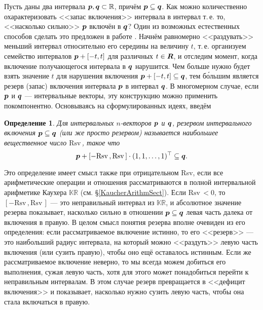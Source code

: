 \documentclass[a5paper,openany]{book}
\newcommand{\mbf}[1]{\protect\text{\boldmath$#1$}}
\newcommand{\mbb}{\mathbb}
\newcommand{\Rsv}{\mathrm{Rsv}\,}
\newtheorem{definition}{Определение}[section]
\begin{document}
Пусть даны два интервала $\mbf{p}, \mbf{q}\subset\mbb{R}$, причём $\mbf{p}\subseteq\mbf{q}$. 
Как можно количественно охарактеризовать <<запас включения>> интервала в интервал т.\,е. то, 
<<насколько сильно>>  $\mbf{p}$ включён в $\mbf{q}$? Один из возможных естественных способов 
сделать это предложен в работе \cite{SharysReserve}. Начнём равномерно <<раздувать>> меньший  
интервал относительно его середины на величину $t$, т.\,е. организуем семейство интервалов 
$\mbf{p} + [-t, t]$ для различных $t\in\mbf{R}$, и отследим момент, когда включение 
получающегося интервала в $\mbf{q}$ нарушится. Чем больше нужно будет взять значение $t$ 
для нарушения включения $\mbf{p} + [-t, t]\subseteq\mbf{q}$, тем б\'{о}льшим является 
резерв (запас) включения интервала $\mbf{p}$ в интервал $\mbf{q}$. В многомерном случае, 
если $\mbf{p}$ и $\mbf{q}$ --- интервальные векторы, эту конструкцию можно применить 
покомпонентно. Основываясь на сформулированных идеях, введём 
  
\begin{definition}   
Для интервальных $n$-векторов $\mbf{p}$ и $\mbf{q}$, \textsl{резервом интервального включения} 
$\mbf{p}\subseteq\mbf{q}$ (или же просто \textsl{резервом}) называется наибольшее вещественное 
число $\Rsv$, такое что             
\begin{equation*} 
\mbf{p} + [-\Rsv, \Rsv]\cdot(1,1,\ldots,1)^{\top}\subseteq\mbf{q}. 
\end{equation*} 
\end{definition} 
  
Это определение имеет смысл также при отрицательном Rsv, если все арифметические операции 
и отношения рассматриваются  в  полной  интервальной арифметике Каухера $\mbb{KR}$  (см. 
\S\ref{KaucherArithmSect}). Если $\Rsv < 0$, то $[-\Rsv, \Rsv]$ --- это неправильный 
интервал из $\mbb{KR}$, и абсолютное значение резерва показывает, насколько сильно 
в отношении  $\mbf{p}\subseteq\mbf{q}$ левая часть далека от включения в правую. В целом 
смысл понятия резерва вполне очевиден из его определения: если рассматриваемое включение 
истинно, то его <<резерв>> --- это наибольший радиус интервала, на который можно <<раздуть>> 
левую часть включения (или сузить правую), чтобы оно ещё оставалось истинным. Если же 
рассматриваемое включение неверно, то мы всегда можем добиться его выполнения, сужая 
левую часть, хотя для этого может понадобиться перейти к неправильным интервалам. В этом 
случае резерв превращается в <<дефицит включения>> и показывает, насколько нужно сузить 
левую часть, чтобы она стала включаться в правую. 
  
\end{document}

